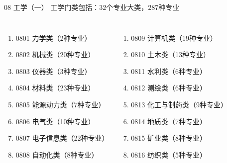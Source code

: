 \documentclass[aspectratio=169]{ctexbeamer} %
\begin{document}
\begin{frame}[t]{08 工学（一）}
工学门类包括：32个专业大类，287种专业 \\

\begin{spacing}{1.0} %
\begin{columns}
{\large
\begin{enumerate}[label={\arabic*.}]
\item 0801 力学类（2种专业）
\item 0802 机械类（20种专业）
\item 0803 仪器类（3种专业）
\item 0804 材料类（23种专业）
\item 0805 能源动力类（7种专业）
\item 0806 电气类（10种专业）
\item 0807 电子信息类（22种专业）
\item 0808 自动化类（8种专业）
\end{enumerate} 
}
{\large
\begin{enumerate}[label={\arabic*.},start=9]
\item 0809 计算机类（19种专业）
\item 0810 土木类（13种专业）
\item 0811 水利类（6种专业）
\item 0812 测绘类（6种专业）
\item 0813 化工与制药类（9种专业）
\item 0814 地质类（7种专业）
\item 0815 矿业类（8种专业）
\item 0816 纺织类（5种专业）
\end{enumerate} 
}
\end{columns}
\end{spacing}
\end{frame}
\end{document}
